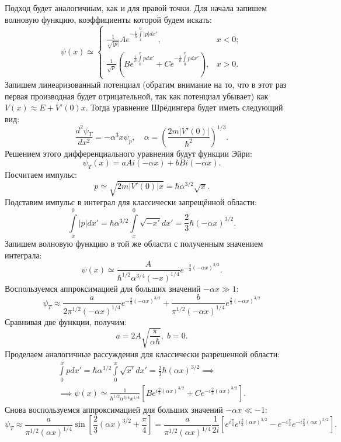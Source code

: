 Подход будет аналогичным, как и для правой точки. Для начала запишем волновую
функцию, коэффициенты которой будем искать:
\[
  \psi(x) \simeq
  \begin{cases}
    \frac{1}{\sqrt{|p|}}Ae^{-\frac{1}{\hbar}\int\limits_x^{0} |p| dx'}, & x < 0;\\
    \frac{1}{\sqrt{p}}\left( Be^{\frac{i}{\hbar}\int\limits_{0}^{x} p dx'} + Ce^{-\frac{i}{\hbar}\int\limits_{0}^{x} p dx'} \right), & x > 0.
  \end{cases}
\]
Запишем линеаризованный потенциал (обратим внимание на то, что в этот раз
первая производная будет отрицательной, так как потенциал убывает) как $V(x)
  \approx E + V'(0)x$. Тогда уравнение Шрёдингера будет иметь следующий вид:
\[
  \frac{d^2\psi_T}{dx^2} = -\alpha^3 x\psi_p, \quad \alpha = \left( \frac{2m|V'(0)|}{\hbar^2} \right)^{1/3}.
\]
Решением этого дифференциального уравнения будут функции Эйри:
\[
  \psi_T(x) = aAi(-\alpha x) + bBi(-\alpha x).
\]
Посчитаем импульс:
\[
  p \simeq \sqrt{2m|V'(0)|x} = \hbar\alpha^{3/2}\sqrt{x}.
\]
Подставим импульс в интеграл для классически запрещённой области:
\[
  \int\limits_{x}^{0} |p| dx' = \hbar\alpha^{3/2} \int\limits_{x}^{0}\sqrt{-x'} dx' = \frac{2}{3}\hbar(-\alpha x)^{3/2}.
\]
Запишем волновую функцию в той же области с полученным значением интеграла:
\[
  \psi(x) \simeq \frac{A}{\hbar^{1/2}\alpha^{3/4}(-x)^{1/4}} e^{-\frac{2}{3}(-\alpha x)^{3/2}}.
\]
Воспользуемся аппроксимацией для больших значений $-\alpha x \gg 1$:
\[
  \psi_T \approx \frac{a}{2\pi^{1/2}(-\alpha x)^{1/4}}e^{-\frac{2}{3}(-\alpha x)^{3/2}} + \frac{b}{\pi^{1/2}(-\alpha x)^{1/4}}e^{\frac{2}{3}(-\alpha x)^{3/2}}
\]
Сравнивая две функции, получим:
\[
  a = 2A\sqrt{\frac{\pi}{\alpha\hbar}},\; b = 0.
\]
Проделаем аналогичные рассуждения для классически разрешенной области:
\begin{gather*}
  \int\limits_{0}^{x} p dx' = \hbar\alpha^{3/2} \int\limits_{0}^{x}\sqrt{x'} dx' = \frac{2}{3}\hbar(\alpha x)^{3/2} \implies \\
  \implies \psi(x) \simeq \frac{1}{\hbar^{1/2}\alpha^{3/4}x^{1/4}}\left[ Be^{i\frac{2}{3}(\alpha x)^{3/2}} + Ce^{-i\frac{2}{3}(\alpha x)^{3/2}} \right].
\end{gather*}
Снова воспользуемся аппроксимацией для больших значений $-\alpha x \ll -1$:
\[
  \psi_T \approx \frac{a}{\pi^{1/2}(\alpha x)^{1/4}}\sin\left[\frac{2}{3}(\alpha x)^{3/2} + \frac{\pi}{4}\right] = \frac{a}{\pi^{1/2}(\alpha x)^{1/4}}\frac{1}{2i}\left[ e^{i\frac{\pi}{4}}e^{i\frac{2}{3}(\alpha x)^{3/2}} - e^{-i\frac{\pi}{4}}e^{-i\frac{2}{3}(\alpha x)^{3/2}} \right].
\]
